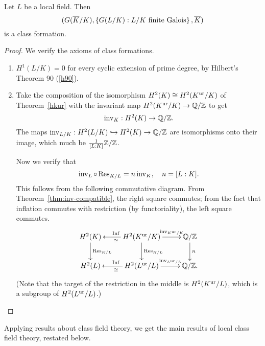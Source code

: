 \begin{thm}
Let $L$ be a local field. Then
\[
(G(\overline{K}/K),\left\{{G(L/K)}:{L/K\text{ finite Galois}}\right\},\overline{K})\]
is a class formation.
\end{thm}
\begin{proof}
We verify the axioms of class formations. 
\begin{enumerate}
\item $H^1(L/K)=0$ for every cyclic extension of prime degree, by Hilbert's Theorem 90 (\ref{h90}).
\item Take the composition of the isomorphism $H^2(K)\cong H^2(K^{\text{ur}}/K)$ of Theorem~\ref{hkur} with the invariant map $H^2(K^{\text{ur}}/K)\to \mathbb{Q}/\mathbb{Z}$ to get
\[
\operatorname{inv}_K:H^2(K)\to \mathbb{Q}/\mathbb{Z}.
\]
The maps $\operatorname{inv}_{L/K}:H^2(L/K)\hookrightarrow H^2(K)\to \mathbb{Q}/\mathbb{Z}$ are isomorphisms onto their image, which much be $\frac{1}{[L:K]}\mathbb{Z}/\mathbb{Z}$.

Now we verify that
\[
\operatorname{inv}_L\circ \operatorname{Res}_{K/L}=n\operatorname{inv}_K,\quad n=[L:K].
\]
This follows from the following commutative diagram. From Theorem~\ref{thm:inv-compatible}, the right square commutes; from the fact that inflation commutes with restriction (by functoriality), the left square commutes.
\[
\xymatrix{
H^2(K) \ar[d]^{\Res_{K/L}} & H^2(K\ur/K)\ar[l]^{\cong}_{\Inf}\ar[d]^{\Res_{K/L}} \ar[r]^-{\inv_{K\ur/K}} & \Q/\Z\ar[d]^{n}\\
H^2(L) & H^2(L\ur/L)\ar[l]^{\cong}_{\Inf} \ar[r]^-{\inv_{L\ur/L}} & \Q/\Z.
}
\]
(Note that the target of the restriction in the middle is $H^2(K^{\text{ur}}/L)$, which is a subgroup of $H^2(L^{\text{ur}}/L)$.)
\qedhere
\end{enumerate}
\end{proof}
Applying results about class field theory, we get the main results of local class field theory, restated below.
